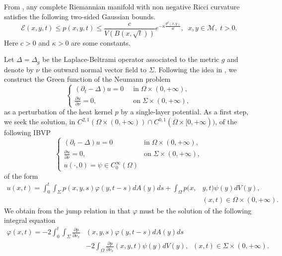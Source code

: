 \documentclass{birkjour}
\begin{document}
\smallskip
From \cite[Theorem 5.5.11 and Theorem 5.6.1, page 173]{Dav}, any complete Riemannian manifold with non negative Ricci curvature satisfies the following two-sided Gaussian bounds.
\[
\mathscr{E}(x,y,t) \le p(x,y,t)\le \frac{c}{V(B(x,\sqrt{t}))}e^{-\kappa \frac{d^2(x,y)}{4t}},\;\; x,y\in \mathcal{M},\; t>0.
\]
Here $c>0$ and $\kappa >0$ are some constants.

\medskip
Let $\Delta =\Delta _g$ be the Laplace-Beltrami operator associated to the metric $g$ and denote by $\nu$ the outward normal vector field to $\Sigma$. Following the idea in \cite{CK}, we construct the Green function of  the Neumann problem
\begin{equation}\label{e1}
\left\{
\begin{array}{ll}
(\partial _t-\Delta )u=0\;\; &\mbox{in}\; \Omega \times (0,+\infty ),
\\
\frac{\partial u}{\partial \nu}=0, &\mbox{on}\; \Sigma \times (0,+\infty ),
\end{array}
\right.
\end{equation}
as a perturbation of the heat kernel $p$ by a single-layer potential. As a first step, we seek the solution, in $C^{2,1}(\Omega \times (0,+\infty ))\cap C^{0,1}(\overline{\Omega}\times [0,+\infty ))$, of the following IBVP
\begin{equation}\label{e2}
\left\{
\begin{array}{ll}
(\partial _t-\Delta )u=0\;\; &\mbox{in}\; \Omega \times (0,+\infty ),
\\
\frac{\partial u}{\partial \nu}=0, &\mbox{on}\; \Sigma \times (0,+\infty ),
\\
u(\cdot ,0)=\psi \in C_0^\infty (\Omega)
\end{array}
\right.
\end{equation}
of the form 
\begin{align*}
u(x,t)=\int_0^t\int_\Sigma p(x,y,s)\varphi (y,t-s)dA(y)ds+\int_\Omega p(x,&y,t)\psi (y)dV(y),
\\ &(x,t)\in \Omega \times (0,+\infty ).
\end{align*}
We obtain from the jump relation in \cite[Theorem 2, page 161]{Cha} that $\varphi$ must be the solution of the following integral equation
\begin{align*}
\varphi (x,t)=-2\int_0^t\int_\Sigma \frac{\partial p}{\partial \nu _x}&(x,y,s)\varphi (y,t-s)dA(y)ds
\\
&-2\int_\Omega \frac{\partial p}{\partial \nu _x}(x,y,t)\psi (y)dV(y),\;\; (x,t)\in \Sigma \times (0,+\infty ).
\end{align*}
\end{document}
